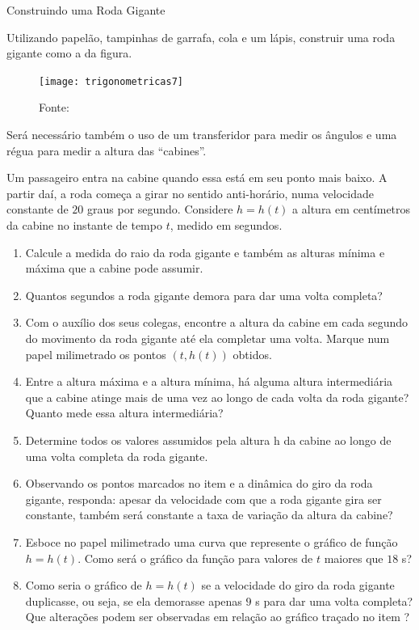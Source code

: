 \begin{task}{Construindo uma Roda Gigante}
\label{trig-ativ3}

Utilizando papelão, tampinhas de garrafa, cola e um lápis, construir uma roda gigante como a da figura.

\begin{figure}[H]
\centering

\texttt{[image: trigonometricas7]}
\caption{Fonte: \cite{soares2010}}
\label{}
\end{figure}

Será necessário também o uso de um transferidor para medir os ângulos e uma régua para medir a altura das “cabines”.

Um passageiro entra na cabine quando essa está em seu ponto mais baixo. A partir daí, a roda começa a girar no sentido anti-horário, numa velocidade constante de $20$ graus por segundo. Considere $h = h(t)$ a altura em centímetros da cabine no instante de tempo $t$, medido em segundos.
\begin{enumerate}
\item Calcule a medida do raio da roda gigante e também as alturas mínima e máxima que a cabine pode assumir.
\item Quantos segundos a roda gigante demora para dar uma volta completa?
\item Com o auxílio dos seus colegas, encontre a altura da cabine em cada segundo do movimento da roda gigante até ela completar uma volta. Marque num papel milimetrado os pontos $(t,h(t))$ obtidos.
\item Entre a altura máxima e a altura mínima, há alguma altura intermediária que a cabine atinge mais de uma vez ao longo de cada volta da roda gigante? Quanto mede essa altura intermediária?
\item Determine todos os valores assumidos pela altura h da cabine ao longo de uma volta completa da roda gigante.
\item Observando os pontos marcados no item  e a dinâmica do giro da roda gigante, responda: apesar da velocidade com que a roda gigante gira ser constante, também será constante a taxa de variação da altura da cabine?  
\item Esboce no papel milimetrado uma curva que represente o gráfico de função $h = h(t)$. Como será o gráfico da função para valores de $t$ maiores que $18$ s?
\item Como seria o gráfico de $h = h(t)$ se a velocidade do giro da roda gigante duplicasse, ou seja, se ela demorasse apenas $9$ s para dar uma volta completa? Que alterações podem ser observadas em relação ao gráfico traçado no item ?
\end{enumerate}

\end{task}


